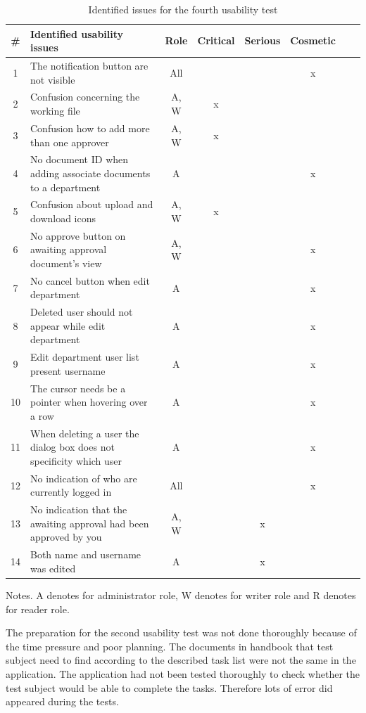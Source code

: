 \begin{table}[H]
	\begin{center}
	\begin{tabular}{| c | m{15em} | c | c | c | c | c | c |}
		\hline
		\# & \textbf{Identified usability issues} & Role & Critical & Serious & Cosmetic \\
		\hline
		 1 & The notification button are not visible & All & & & x \\
		\hline
		 2 & Confusion concerning the working file & A, W & x & & \\
		\hline
		 3 & Confusion how to add more than one approver & A, W & x & & \\
		\hline
		4 & No document ID when adding associate documents to a department & A & & & x\\
		\hline
		5 &  Confusion about upload and download icons & A, W & x &  &\\
		\hline
		6 & No approve button on awaiting approval document's view & A, W &  & & x\\
		\hline
		7 & No cancel button when edit department & A & & & x\\
		\hline
		8 & Deleted user should not appear while edit department & A & & & x \\
		\hline
		9 & Edit department user list present username & A &  & & x \\
		\hline
		10 & The cursor needs be a pointer when hovering over a row & A &  &  & x \\
		\hline
		11 & When deleting a user the dialog box  does not specificity which user & A & & & x\\
		\hline
		12 & No indication of who are currently logged in & All & & & x \\
		\hline
		13 & No indication that the awaiting approval had been approved by you & A, W & & x & \\
		\hline
		14 & Both name and username was edited & A & & x & \\
		\hline
	\end{tabular}
	\end{center}
	 {\raggedright Notes. A denotes for administrator role, W denotes for writer role and R denotes for reader role.\par}
	\caption{Identified issues for the fourth usability test}\label{tab:utest4}
\end{table}

The preparation for the second usability test was not done thoroughly because of the time pressure and poor planning.
The documents in handbook that test subject need to find according to the  described task list were not the same in the application.
The application had not been tested thoroughly to check whether the test subject would be able to complete the tasks.
Therefore lots of error did appeared during the tests.

